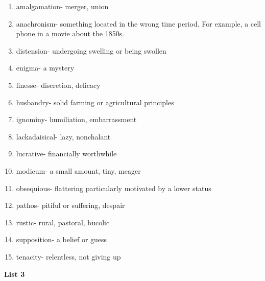 \begin{enumerate}

\item amalgamation- merger, union

\item anachronism- something located in the wrong time period. For example, a cell phone in a movie about the 1850s. 

\item distension- undergoing swelling or being swollen

\item enigma- a mystery

\item finesse- discretion, delicacy

\item husbandry- solid farming or agricultural principles

\item ignominy- humiliation, embarrassment 

\item lackadaisical- lazy, nonchalant 

\item lucrative- financially worthwhile

\item modicum- a small amount, tiny, meager

\item obsequious- flattering particularly motivated by a lower status

\item pathos- pitiful or suffering, despair

\item rustic- rural, pastoral, bucolic

\item supposition- a belief or guess

\item tenacity- relentless, not giving up

\end{enumerate}

\textbf{List 3}

